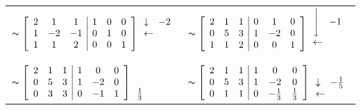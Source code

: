 \documentclass[11pt]{amsbook}
\begin{document}
\begin{tabular}{ll}
$\thicksim\left[\begin{array}{ccc|ccc}
2 & 1 & 1  & 1 & 0 & 0 \\
1 & -2 & -1 & 0 & 1 & 0 \\
1 & 1 & 2 & 0 & 0 & 1
\end{array}\right]\begin{array}{ll} 
\downarrow & -2 \\ 
\multicolumn{2}{l}{\leftarrow} \\
\\\end{array}$
&
$\thicksim\left[\begin{array}{ccc|ccc}
2 & 1 & 1  & 0 & 1 & 0 \\
0 & 5 & 3 & 1 & -2 & 0 \\
1 & 1 & 2 & 0 & 0 & 1
\end{array}\right]
\begin{array}{cc} 
\Bigg\downarrow & -1 \\ 
\multicolumn{2}{l}{\leftarrow}\\ 
\\\end{array}$

\\

$\thicksim\left[\begin{array}{ccc|ccc}
2 & 1 & 1  & 1 & 0 & 0 \\
0 & 5 & 3 & 1 & -2 & 0 \\
0 & 3 & 3 & 0 & -1 & 1
\end{array}\right]
\begin{array}{c}\\ \\ \frac{1}{3} \\\end{array}$
&
$\thicksim\left[\begin{array}{ccc|ccc}
2 & 1 & 1  & 1 & 0 & 0 \\
0 & 5 & 3 & 1 & -2 & 0 \\
0 & 1 & 1 & 0 & -\frac{1}{3} & \frac{1}{3}
\end{array}\right]
\begin{array}{cc}
\\ \downarrow & -\frac{1}{5} 
\\ \multicolumn{2}{l}{\leftarrow}
\\\end{array}$

\\


\end{tabular}
\end{document}

